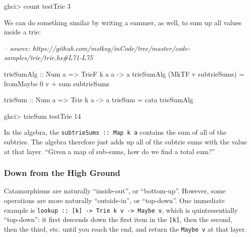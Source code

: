 \documentclass[]{article}
\newenvironment{Shaded}{}{}
\newcommand{\CommentTok}[1]{\textcolor[rgb]{0.38,0.63,0.69}{\textit{#1}}}
\newcommand{\DataTypeTok}[1]{\textcolor[rgb]{0.56,0.13,0.00}{#1}}
\newcommand{\DecValTok}[1]{\textcolor[rgb]{0.25,0.63,0.44}{#1}}
\newcommand{\FunctionTok}[1]{\textcolor[rgb]{0.02,0.16,0.49}{#1}}
\newcommand{\NormalTok}[1]{#1}
\newcommand{\OtherTok}[1]{\textcolor[rgb]{0.00,0.44,0.13}{#1}}
\begin{document}
\begin{Shaded}
\begin{Highlighting}[]
\NormalTok{ghci}\FunctionTok{>}\NormalTok{ count testTrie}
\DecValTok{3}
\end{Highlighting}
\end{Shaded}

We can do something similar by writing a summer, as well, to sum up all values
inside a trie:

\begin{Shaded}
\begin{Highlighting}[]
\CommentTok{-- source: https://github.com/mstksg/inCode/tree/master/code-samples/trie/trie.hs#L71-L75}

\OtherTok{trieSumAlg ::} \DataTypeTok{Num}\NormalTok{ a }\OtherTok{=>} \DataTypeTok{TrieF}\NormalTok{ k a a }\OtherTok{->}\NormalTok{ a}
\NormalTok{trieSumAlg (}\DataTypeTok{MkTF}\NormalTok{ v subtrieSums) }\FunctionTok{=}\NormalTok{ fromMaybe }\DecValTok{0}\NormalTok{ v }\FunctionTok{+}\NormalTok{ sum subtrieSums}

\OtherTok{trieSum ::} \DataTypeTok{Num}\NormalTok{ a }\OtherTok{=>} \DataTypeTok{Trie}\NormalTok{ k a }\OtherTok{->}\NormalTok{ a}
\NormalTok{trieSum }\FunctionTok{=}\NormalTok{ cata trieSumAlg}
\end{Highlighting}
\end{Shaded}

\begin{Shaded}
\begin{Highlighting}[]
\NormalTok{ghci}\FunctionTok{>}\NormalTok{ trieSum testTrie}
\DecValTok{14}
\end{Highlighting}
\end{Shaded}

In the algebra, the \texttt{subtrieSums\ ::\ Map\ k\ a} contains the sum of all
of the subtries. The algebra therefore just adds up all of the subtrie sums with
the value at that layer. ``Given a map of sub-sums, how do we find a total
sum?''

\hypertarget{down-from-the-high-ground}{%
\subsubsection{Down from the High Ground}\label{down-from-the-high-ground}}

Catamorphisms are naturally ``inside-out'', or ``bottom-up''. However, some
operations are more naturally ``outside-in'', or ``top-down''. One immediate
example is
\texttt{lookup\ ::\ {[}k{]}\ -\textgreater{}\ Trie\ k\ v\ -\textgreater{}\ Maybe\ v},
which is quintessentially ``top-down'': it first descends down the first item in
the \texttt{{[}k{]}}, then the second, then the third, etc. until you reach the
end, and return the \texttt{Maybe\ v} at that layer.
\end{document}
